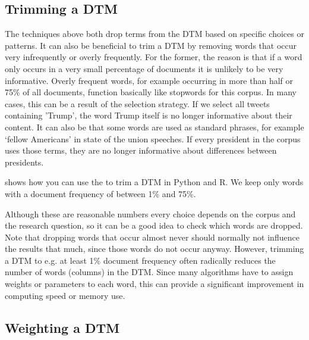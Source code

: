  

\subsection{Trimming a DTM}

The techniques above both drop terms from the DTM based on specific choices or patterns.
It can also be beneficial to trim a DTM by removing words that occur very infrequently or overly frequently.
For the former, the reason is that if a word only occurs in a very small percentage of documents it is unlikely to be very informative.
Overly frequent words, for example occurring in more than half or 75\% of all documents, function basically like stopwords for this corpus.
In many cases, this can be a result of the selection strategy. If we select all tweets containing 'Trump', the word Trump itself is no longer informative about their content.
It can also be that some words are used as standard phrases, for example `fellow Americans' in state of the union speeches.
If every president in the corpus uses those terms, they are no longer informative about differences between presidents.


 shows how you can use the  to trim a DTM in Python and R.
We keep only words with a document frequency of between 1\% and 75\%.

Although these are reasonable numbers every choice depends on the corpus and the research question, so it can be a good idea to check which words are dropped.
Note that dropping words that occur almost never should normally not influence the results that much, since those words do not occur anyway.
However, trimming a DTM to e.g. at least 1\% document frequency often radically reduces the number of words (columns) in the DTM.
Since many algorithms have to assign weights or parameters to each word, this can provide a significant improvement in computing speed or memory use. 

\subsection{Weighting a DTM}

